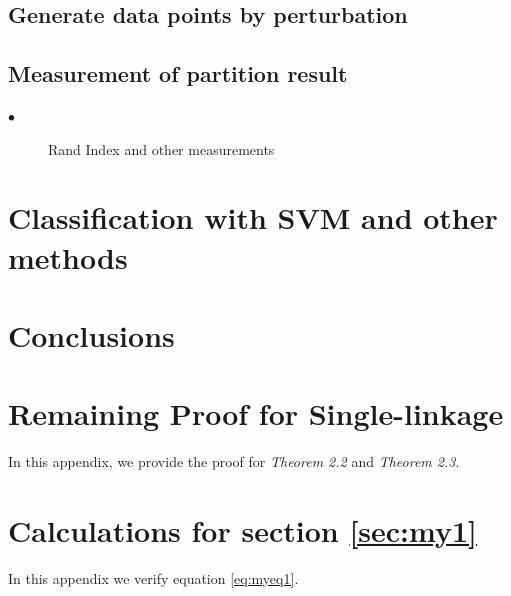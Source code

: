 \documentclass{uonmathreport}
\begin{document}
\subsection{Generate data points by perturbation} \label{subsec:blue}

\subsection{Measurement of partition result} \label{subsubsec:red}

\begin{description}
  \item[$\bullet$] Rand Index and other measurements
\end{description}



\section{Classification with SVM and other methods} \label{sec:Classification}



\section{Conclusions} \label{sec:conclusions}



\newpage

\appendix

\section{Remaining Proof for Single-linkage} \label{app:proof}
In this appendix, we provide the proof for \textit{Theorem 2.2} and  \textit{Theorem 2.3}.


\section{Calculations for section \ref{sec:my1}} \label{app:calculations}

In this appendix we verify equation \eqref{eq:myeq1}.

\newpage



\end{document}
